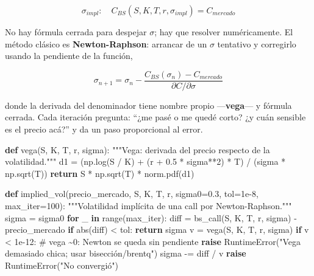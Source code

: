 \documentclass[
  spanish,
  letterpaper,
  DIV=11,
  numbers=noendperiod]{scrreprt}
\newenvironment{Shaded}{\begin{snugshade}}{\end{snugshade}}
\newcommand{\BuiltInTok}[1]{\textcolor[rgb]{0.00,0.23,0.31}{#1}}
\newcommand{\CommentTok}[1]{\textcolor[rgb]{0.37,0.37,0.37}{#1}}
\newcommand{\ControlFlowTok}[1]{\textcolor[rgb]{0.00,0.23,0.31}{\textbf{#1}}}
\newcommand{\DecValTok}[1]{\textcolor[rgb]{0.68,0.00,0.00}{#1}}
\newcommand{\FloatTok}[1]{\textcolor[rgb]{0.68,0.00,0.00}{#1}}
\newcommand{\KeywordTok}[1]{\textcolor[rgb]{0.00,0.23,0.31}{\textbf{#1}}}
\newcommand{\NormalTok}[1]{\textcolor[rgb]{0.00,0.23,0.31}{#1}}
\newcommand{\OperatorTok}[1]{\textcolor[rgb]{0.37,0.37,0.37}{#1}}
\newcommand{\PreprocessorTok}[1]{\textcolor[rgb]{0.68,0.00,0.00}{#1}}
\newcommand{\StringTok}[1]{\textcolor[rgb]{0.13,0.47,0.30}{#1}}
\begin{document}
\[\sigma_{impl} : \quad C_{BS}(S, K, T, r, \sigma_{impl}) = C_{mercado}\]

No hay fórmula cerrada para despejar \(\sigma\); hay que resolver
numéricamente. El método clásico es \textbf{Newton-Raphson}: arrancar de
un \(\sigma\) tentativo y corregirlo usando la pendiente de la función,

\[\sigma_{n+1} = \sigma_n - \frac{C_{BS}(\sigma_n) - C_{mercado}}{\partial C / \partial \sigma}\]

donde la derivada del denominador tiene nombre propio
---\textbf{vega}--- y fórmula cerrada. Cada iteración pregunta: ``¿me
pasé o me quedé corto? ¿y cuán sensible es el precio acá?'' y da un paso
proporcional al error.

\label{vol-implicita}
\begin{Shaded}
\begin{Highlighting}[]
\KeywordTok{def}\NormalTok{ vega(S, K, T, r, sigma):}
    \CommentTok{"""Vega: derivada del precio respecto de la volatilidad."""}
\NormalTok{    d1 }\OperatorTok{=}\NormalTok{ (np.log(S }\OperatorTok{/}\NormalTok{ K) }\OperatorTok{+}\NormalTok{ (r }\OperatorTok{+} \FloatTok{0.5} \OperatorTok{*}\NormalTok{ sigma}\OperatorTok{**}\DecValTok{2}\NormalTok{) }\OperatorTok{*}\NormalTok{ T) }\OperatorTok{/}\NormalTok{ (sigma }\OperatorTok{*}\NormalTok{ np.sqrt(T))}
    \ControlFlowTok{return}\NormalTok{ S }\OperatorTok{*}\NormalTok{ np.sqrt(T) }\OperatorTok{*}\NormalTok{ norm.pdf(d1)}

\KeywordTok{def}\NormalTok{ implied\_vol(precio\_mercado, S, K, T, r, sigma0}\OperatorTok{=}\FloatTok{0.3}\NormalTok{, tol}\OperatorTok{=}\FloatTok{1e{-}8}\NormalTok{, max\_iter}\OperatorTok{=}\DecValTok{100}\NormalTok{):}
    \CommentTok{"""Volatilidad implícita de una call por Newton{-}Raphson."""}
\NormalTok{    sigma }\OperatorTok{=}\NormalTok{ sigma0}
    \ControlFlowTok{for}\NormalTok{ \_ }\KeywordTok{in} \BuiltInTok{range}\NormalTok{(max\_iter):}
\NormalTok{        diff }\OperatorTok{=}\NormalTok{ bs\_call(S, K, T, r, sigma) }\OperatorTok{{-}}\NormalTok{ precio\_mercado}
        \ControlFlowTok{if} \BuiltInTok{abs}\NormalTok{(diff) }\OperatorTok{\textless{}}\NormalTok{ tol:}
            \ControlFlowTok{return}\NormalTok{ sigma}
\NormalTok{        v }\OperatorTok{=}\NormalTok{ vega(S, K, T, r, sigma)}
        \ControlFlowTok{if}\NormalTok{ v }\OperatorTok{\textless{}} \FloatTok{1e{-}12}\NormalTok{:                      }\CommentTok{\# vega \textasciitilde{}0: Newton se queda sin pendiente}
            \ControlFlowTok{raise} \PreprocessorTok{RuntimeError}\NormalTok{(}\StringTok{"Vega demasiado chica; usar bisección/brentq"}\NormalTok{)}
\NormalTok{        sigma }\OperatorTok{{-}=}\NormalTok{ diff }\OperatorTok{/}\NormalTok{ v}
    \ControlFlowTok{raise} \PreprocessorTok{RuntimeError}\NormalTok{(}\StringTok{"No convergió"}\NormalTok{)}


\end{Highlighting}
\end{Shaded}
\end{document}
